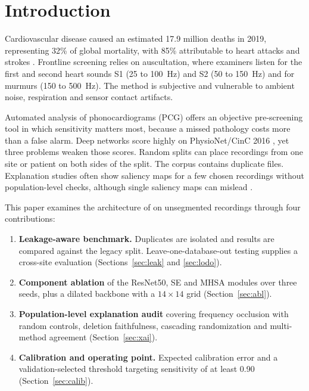 \documentclass[conference]{IEEEtran}
\begin{document}
\section{Introduction}
Cardiovascular disease caused an estimated 17.9 million deaths in 2019, representing 32\% of global mortality, with 85\% attributable to heart attacks and strokes \cite{who_cvd}. Frontline screening relies on auscultation, where examiners listen for the first and second heart sounds S1 (25 to 100~Hz) and S2 (50 to 150~Hz) and for murmurs (150 to 500~Hz). The method is subjective and vulnerable to ambient noise, respiration and sensor contact artifacts.

Automated analysis of phonocardiograms (PCG) offers an objective pre-screening tool in which sensitivity matters most, because a missed pathology costs more than a false alarm. Deep networks score highly on PhysioNet/CinC 2016 \cite{clifford}, yet three problems weaken those scores. Random splits can place recordings from one site or patient on both sides of the split. The corpus contains duplicate files. Explanation studies often show saliency maps for a few chosen recordings without population-level checks, although single saliency maps can mislead \cite{chakrabarty}.

This paper examines the architecture of \cite{alrabie} on unsegmented recordings through four contributions:
\begin{enumerate}
\item \textbf{Leakage-aware benchmark.} Duplicates are isolated and results are compared against the legacy split. Leave-one-database-out testing supplies a cross-site evaluation (Sections~\ref{sec:leak} and \ref{sec:lodo}).
\item \textbf{Component ablation} of the ResNet50, SE and MHSA modules over three seeds, plus a dilated backbone with a $14\times14$ grid (Section~\ref{sec:abl}).
\item \textbf{Population-level explanation audit} covering frequency occlusion with random controls, deletion faithfulness, cascading randomization and multi-method agreement (Section~\ref{sec:xai}).
\item \textbf{Calibration and operating point.} Expected calibration error and a validation-selected threshold targeting sensitivity of at least 0.90 (Section~\ref{sec:calib}).
\end{enumerate}

\end{document}
